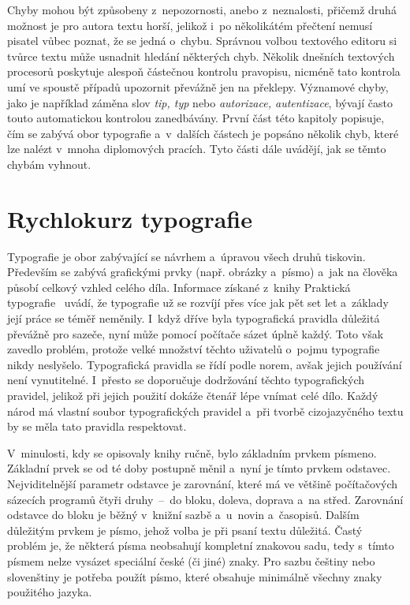 Chyby mohou být způsobeny z~nepozornosti, anebo z~neznalosti, přičemž druhá možnost
je pro autora textu horší, jelikož i~po několikátém přečtení nemusí pisatel vůbec
poznat, že se jedná o~chybu. Správnou volbou textového editoru si tvůrce textu
může usnadnit hledání některých chyb. Několik dnešních textových procesorů poskytuje
alespoň částečnou kontrolu pravopisu, nicméně tato kontrola umí ve spoustě případů
upozornit převážně jen na překlepy. Významové chyby, jako je například záměna slov
\emph{tip, typ} nebo \emph{autorizace, autentizace}, bývají často touto
automatickou kontrolou zanedbávány. První část této kapitoly popisuje,
čím se zabývá obor typografie a~v~dalších částech je popsáno několik
chyb, které lze nalézt v~mnoha diplomových pracích. Tyto části dále uvádějí,
jak se těmto chybám vyhnout.


\section{Rychlokurz typografie}
Typografie je obor zabývající se návrhem a~úpravou všech druhů tiskovin.
Především se zabývá grafickými prvky (např. obrázky a~písmo) a~jak na člověka
působí celkový vzhled celého díla.
Informace získané z~knihy Praktická typografie~\cite{Prakticka_typografie}
uvádí, že typografie už se rozvíjí přes více jak pět set
let a~základy její práce se téměř neměnily. I~když dříve byla typografická
pravidla důležitá převážně pro sazeče, nyní může pomocí počítače sázet
úplně každý. Toto však zavedlo problém, protože velké množství těchto
uživatelů o~pojmu typografie nikdy neslyšelo. Typografická pravidla se řídí podle
norem, avšak jejich používání není vynutitelné. I~přesto se doporučuje
dodržování těchto typografických pravidel, jelikož při jejich použití
dokáže čtenář lépe vnímat celé dílo. Každý národ má vlastní
soubor typografických pravidel a~při tvorbě cizojazyčného textu by se
měla tato pravidla respektovat.

V~minulosti, kdy se opisovaly knihy ručně, bylo základním prvkem písmeno. 
Základní prvek se od té doby postupně měnil a~nyní je tímto prvkem odstavec.
Nejviditelnější parametr odstavce je zarovnání, které má ve většině 
počítačových sázecích programů čtyři druhy~--~do bloku, doleva, doprava 
a~na střed. Zarovnání odstavce do bloku je běžný v~knižní sazbě a~u~novin
a~časopisů. Dalším důležitým prvkem je písmo, jehož volba je při psaní textu
důležitá. Častý problém je, že některá písma neobsahují kompletní znakovou
sadu, tedy s~tímto písmem nelze vysázet speciální české (či jiné) znaky.
Pro sazbu češtiny nebo slovenštiny je potřeba použít písmo, které obsahuje
minimálně všechny znaky použitého jazyka.

